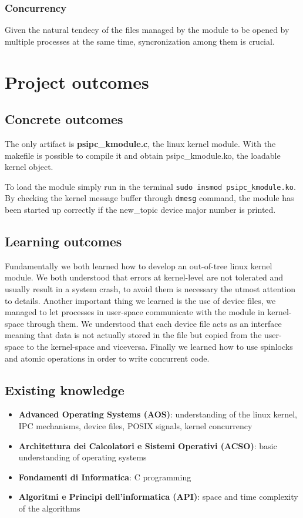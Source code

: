 \documentclass[10pt,a4]{article}
\newcommand{\code}[1]{\texttt{#1}}
\begin{document}
\subsubsection*{Concurrency}
Given the natural tendecy of the files managed by the module to be opened by multiple processes at the same time, syncronization among them is crucial. 

\section{Project outcomes}

\subsection{Concrete outcomes}
The only artifact is \textbf{psipc\_kmodule.c}, the linux kernel module.
With the makefile is possible to compile it and obtain psipc\_kmodule.ko, the loadable kernel object.

To load the module simply run in the terminal \code{sudo insmod psipc\_kmodule.ko}. By checking the kernel message buffer through \code{dmesg} command, the module has been started up correctly if the new\_topic device major number is printed.

\subsection{Learning outcomes}

Fundamentally we both learned how to develop an out-of-tree linux kernel module.
We both understood that errors at kernel-level are not tolerated and usually result in a system crash, to avoid them is necessary the utmost attention to details.
Another important thing we learned is the use of device files, we managed to let processes in user-space communicate with the module in kernel-space through them.
We understood that each device file acts as an interface meaning that data is not actually stored in the file but copied from the user-space to the kernel-space and viceversa.
Finally we learned how to use spinlocks and atomic operations in order to write concurrent code.

\subsection{Existing knowledge}
\begin{itemize}
  \item \textbf{Advanced Operating Systems (AOS)}: understanding of the linux kernel, IPC mechanisms, device files, POSIX signals, kernel concurrency
  \item \textbf{Architettura dei Calcolatori e Sistemi Operativi (ACSO)}: basic understanding of operating systems
  \item \textbf{Fondamenti di Informatica}: C programming
  \item \textbf{Algoritmi e Principi dell'informatica (API)}: space and time complexity of the algorithms
\end{itemize}
\end{document}
